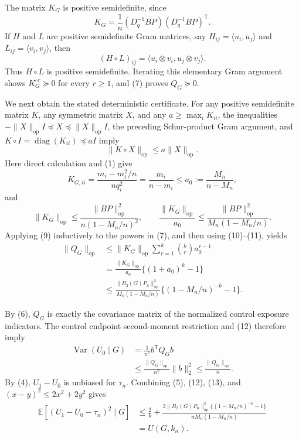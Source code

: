 The matrix \(K_G\) is positive semidefinite, since
\[
K_G=\frac1n(D_q^{-1}BP)(D_q^{-1}BP)^{\mathsf T}.
\tag{8}
\]
If \(H\) and \(L\) are positive semidefinite Gram matrices, say
\(H_{ij}=\langle u_i,u_j\rangle\) and
\(L_{ij}=\langle v_i,v_j\rangle\), then
\[
(H\circ L)_{ij}
=\langle u_i\otimes v_i,u_j\otimes v_j\rangle.
\]
Thus \(H\circ L\) is positive semidefinite.  Iterating this elementary
Gram argument shows \(K_G^{\circ r}\succeq0\) for every \(r\ge1\), and
(7) proves \(Q_G\succeq0\).

We next obtain the stated deterministic certificate.  For any positive
semidefinite matrix \(K\), any symmetric matrix \(X\), and any
\(a\ge\max_iK_{ii}\), the inequalities
\(-\|X\|_{\mathrm{op}}I\preceq X\preceq\|X\|_{\mathrm{op}}I\), the
preceding Schur-product Gram argument, and
\(K\circ I=\operatorname{diag}(K_{ii})\preceq aI\) imply
\[
\|K\circ X\|_{\mathrm{op}}
\le a\|X\|_{\mathrm{op}}.
\tag{9}
\]
Here direct calculation and (1) give
\[
K_{G,ii}
=\frac{m_i-m_i^2/n}{nq_i^2}
=\frac{m_i}{n-m_i}
\le a_0:=\frac{M_n}{n-M_n},
\tag{10}
\]
and
\[
\|K_G\|_{\mathrm{op}}
\le\frac{\|BP\|_{\mathrm{op}}^2}
{n(1-M_n/n)^2},
\qquad
\frac{\|K_G\|_{\mathrm{op}}}{a_0}
\le\frac{\|BP\|_{\mathrm{op}}^2}
{M_n(1-M_n/n)}.
\tag{11}
\]
Applying (9) inductively to the powers in (7), and then using (10)--(11),
yields
\[
\begin{aligned}
\|Q_G\|_{\mathrm{op}}
&\le \|K_G\|_{\mathrm{op}}
\sum_{r=1}^{k}\binom{k}{r}a_0^{r-1}\\
&=\frac{\|K_G\|_{\mathrm{op}}}{a_0}
\{(1+a_0)^k-1\}\\
&\le
\frac{\|B_2(G)P_n\|_{\mathrm{op}}^2}
{M_n(1-M_n/n)}
\{(1-M_n/n)^{-k}-1\}.
\end{aligned}
\tag{12}
\]

By (6), \(Q_G\) is exactly the covariance matrix of the normalized control
exposure indicators.  The control endpoint second-moment restriction and
(12) therefore imply
\[
\begin{aligned}
\operatorname{Var}(U_0\mid G)
&=\frac1{n^2}b^{\mathsf T}Q_Gb\\
&\le\frac{\|Q_G\|_{\mathrm{op}}}{n^2}\|b\|_2^2
\le\frac{\|Q_G\|_{\mathrm{op}}}{n}.
\end{aligned}
\tag{13}
\]
By (4), \(U_1-U_0\) is unbiased for \(\tau_n\).  Combining (5), (12),
(13), and \((x-y)^2\le2x^2+2y^2\) gives
\[
\begin{aligned}
\mathbb E[(U_1-U_0-\tau_n)^2\mid G]
&\le \frac2k+
\frac{2\|B_2(G)P_n\|_{\mathrm{op}}^2
\{(1-M_n/n)^{-k}-1\}}
{nM_n(1-M_n/n)}\\
&=U(G,k_n).
\end{aligned}
\tag{14}
\]

